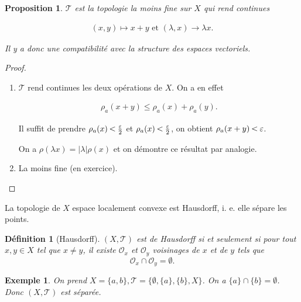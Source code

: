 \documentclass[french]{book}
\newtheorem{prop}{Proposition}[section]
\newtheorem{definition}{Définition}[section]
\newtheorem{exemple}{Exemple}
\newcommand{\lesss}{\rotatebox[origin=c]{90}{$\land$}}
\newcommand{\less}{\ \lesss\ }
\begin{document}
\begin{prop}
  $\mathscr{T} $ est la topologie la moins fine sur $X$ qui rend continues

  \begin{gather*}
    (x,y) \mapsto x+y \text{ et } (\lambda , x) \to \lambda x.
  \end{gather*}

  Il y a donc une compatibilité avec la structure des espaces vectoriels.
\end{prop}

\begin{proof}

  \begin{enumerate}
    \item   $\mathscr{T} $ rend continues les deux opérations de $X$. On a en effet

      \begin{gather*}
        \rho_a(x+y) \leq \rho_a(x)+ \rho_a(y).
      \end{gather*}

      Il suffit de prendre $\rho_a(x) \less \frac{\varepsilon }{2}$ et $\rho_a(x) \less \frac{\varepsilon }{2}$, on obtient $\rho_a(x+y) \less \varepsilon $.

      On a $\rho(\lambda x) = \lvert \lambda \rvert \rho(x)$ et on démontre ce résultat par analogie.

      \item La moins fine (en exercice).
  \end{enumerate}

\end{proof}

\begin{thm}\label{Hausdorff}
  La topologie de $X$ espace localement convexe est Hausdorff, i. e. elle sépare les points.
\end{thm}

\begin{definition}[Hausdorff]
  $(X, \mathscr{T} )$ est de Hausdorff si et seulement si pour tout $x, y \in X$ tel que $x \neq y$, il existe $\mathcal{O}_x$ et $\mathcal{O}_y$ voisinages de $x$ et de $y$ tels que $$ \mathcal{O}_x \cap \mathcal{O}_y = \emptyset.$$
\end{definition}


\begin{exemple}
  On prend $X = \{ a,b \}, \mathscr{T} = \{ \emptyset, \{ a \}, \{ b \}, X \}  $. On a $\{ a \} \cap \{ b \} = \emptyset $. Donc $(X, \mathscr{T} )$ est séparée.
\end{exemple}
\end{document}
